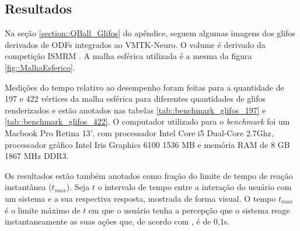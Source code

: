 \documentclass[
    12pt,                %
    oneside,            %
    a4paper,            %
    english,            %
    french,                %
    spanish,            %
    brazil                %
    ]{abntex2}
\begin{document}

\subsection{Resultados}


Na seção \ref{section::QBall_Glifos} do apêndice, seguem algumas imagens dos glifos derivados de ODFs integrados ao VMTK-Neuro. O volume é derivado da competição ISMRM \cite{TractometerTool}. A malha esférica utilizada é a mesma da figura \ref{fig::MalhaEsferico}.

Medições do tempo relativo ao desempenho foram feitas para a quantidade de 197 e 422 vértices da malha esférica para diferentes quantidades de glifos renderizados e estão anotados nas tabelas \ref{tab::benchmark_glifos_197} e \ref{tab::benchmark_glifos_422}. O computador utilizado para o \textit{benchmark} foi um Macbook Pro Retina 13', com processador Intel Core i5 Dual-Core 2.7Ghz, processador gráfico Intel Iris Graphics 6100 1536 MB e memória RAM de 8 GB 1867 MHz DDR3.

Os resultados estão também anotados como fração do limite de tempo de reação instantânea ($t_{max}$). Seja $t$ o intervalo de tempo entre a interação do usuário com um sistema e a sua respectiva resposta, mostrada de forma visual. O tempo $t_{max}$ é o limite máximo de $t$ em que o usuário tenha a percepção que o sistema reage instantaneamente as suas ações que, de acordo com , é de 0,1s.

\end{document}
